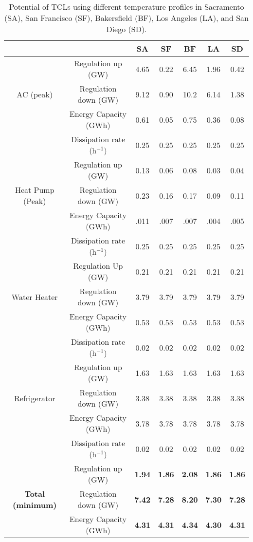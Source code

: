 \documentclass[onecolumn,journal]{IEEEtran}
\begin{document}
\begin{table}[tb]
\caption{Potential of \acp{TCL} using different temperature profiles in Sacramento (SA), San Francisco (SF), Bakersfield (BF), Los Angeles (LA), and San Diego (SD).}
\label{tab:potential}
\vspace{6 pt}
\centering
{\scriptsize
\begin{tabular}{c c|| c| c | c | c | c}
 & & SA & SF & BF & LA & SD \\
 \hline \hline
\multirow{3}{*}{AC (peak)} & Regulation up (GW) &  4.65 & 0.22 & 6.45 & 1.96 &0.42 \\
 & Regulation down (GW)  &  9.12 & 0.90 & 10.2& 6.14 & 1.38 \\
 & Energy Capacity (GWh)  &  0.61 & 0.05 & 0.75 & 0.36 & 0.08 \\
 & Dissipation rate (h$^{-1}$) & 0.25 & 0.25 & 0.25 & 0.25 & 0.25 \\
\hline
\multirow{3}{*}{Heat Pump (Peak)} & Regulation up (GW)  &  0.13 & 0.06 & 0.08 & 0.03 & 0.04 \\
 & Regulation down (GW)  &  0.23 & 0.16 & 0.17 & 0.09 & 0.11 \\
 & Energy Capacity (GWh)  &  .011 & .007 & .007 & .004 & .005 \\
 & Dissipation rate (h$^{-1}$) & 0.25 & 0.25 & 0.25 & 0.25 & 0.25 \\
\hline
\multirow{3}{*}{Water Heater} & Regulation Up (GW)  &  0.21 & 0.21 & 0.21 & 0.21 &0.21\\
 & Regulation down (GW) &  3.79 & 3.79 & 3.79 & 3.79 & 3.79 \\
 & Energy Capacity (GWh) &  0.53 & 0.53 & 0.53 & 0.53 &0.53 \\
  & Dissipation rate (h$^{-1}$) & 0.02 & 0.02 & 0.02 & 0.02 & 0.02 \\
\hline
\multirow{3}{*}{Refrigerator} & Regulation up  (GW) &  1.63 & 1.63 & 1.63 & 1.63 &1.63 \\
 & Regulation down (GW)  &  3.38 & 3.38 & 3.38 & 3.38 &3.38 \\
 & Energy Capacity (GWh) &  3.78 & 3.78 & 3.78 & 3.78 &3.78 \\
  & Dissipation rate (h$^{-1}$) & 0.02 & 0.02 & 0.02 & 0.02 & 0.02 \\
\hline \hline
 \multirow{3}{*}{\textbf{Total (minimum)}} & Regulation up  (GW) &  \textbf{1.94} & \textbf{1.86} & \textbf{2.08} & \textbf{1.86} & \textbf{1.86} \\
 & Regulation down (GW)  &  \textbf{7.42} & \textbf{7.28} & \textbf{8.20} & \textbf{7.30} & \textbf{7.28} \\
 & Energy Capacity (GWh) &  \textbf{4.31} & \textbf{4.31} & \textbf{4.34} & \textbf{4.30} & \textbf{4.31}
\end{tabular}}
\end{table}
\end{document}
